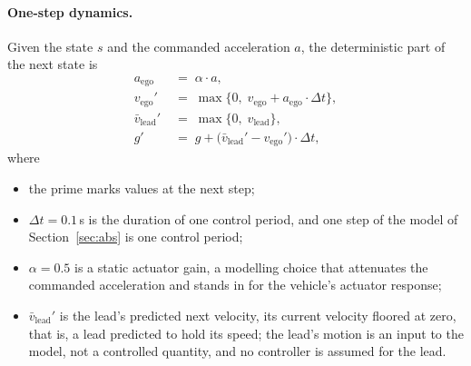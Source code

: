 \documentclass[11pt,a4paper]{article}
\newcommand{\dt}{\Delta t}
\newcommand{\vego}{v_{\text{ego}}}
\newcommand{\vlead}{v_{\text{lead}}}
\theoremstyle{plain}
\theoremstyle{remark}
\begin{document}
	\paragraph{One-step dynamics.}
	Given the state $s$ and the commanded acceleration $a$, the deterministic part of the next state is
	\begin{align}
		a_{\text{ego}} &\;=\; \alpha \cdot a, \label{eq:lag}\\
		\vego' &\;=\; \max\!\bigl\{0,\; \vego + a_{\text{ego}} \cdot \dt\bigr\}, \label{eq:vego}\\
		\bar{v}_{\text{lead}}' &\;=\; \max\!\bigl\{0,\; \vlead\bigr\}, \label{eq:vlead}\\
		g' &\;=\; g + \bigl(\bar{v}_{\text{lead}}' - \vego'\bigr) \cdot \dt, \label{eq:gap}
	\end{align}
	where
	\begin{itemize}
		\item the prime marks values at the next step;
		\item $\dt = 0.1$\,s is the duration of one control period, and one step of the model of Section~\ref{sec:abs} is one control period;
		\item $\alpha = 0.5$ is a static actuator gain, a modelling choice that attenuates the commanded acceleration and stands in for the vehicle's actuator response;
		\item $\bar{v}_{\text{lead}}'$ is the lead's predicted next velocity, its current velocity floored at zero, that is, a lead predicted to hold its speed; the lead's motion is an input to the model, not a controlled quantity, and no controller is assumed for the lead.
	\end{itemize}
	
\end{document}
